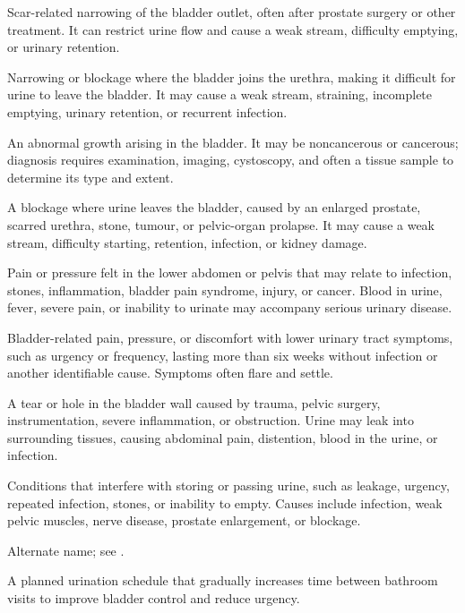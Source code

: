  Scar-related narrowing of the bladder outlet, often after prostate surgery or other treatment. It can restrict urine flow and cause a weak stream, difficulty emptying, or urinary retention.

 Narrowing or blockage where the bladder joins the urethra, making it difficult for urine to leave the bladder. It may cause a weak stream, straining, incomplete emptying, urinary retention, or recurrent infection.

 An abnormal growth arising in the bladder. It may be noncancerous or cancerous; diagnosis requires examination, imaging, cystoscopy, and often a tissue sample to determine its type and extent.

 A blockage where urine leaves the bladder, caused by an enlarged prostate, scarred urethra, stone, tumour, or pelvic-organ prolapse. It may cause a weak stream, difficulty starting, retention, infection, or kidney damage.

 Pain or pressure felt in the lower abdomen or pelvis that may relate to infection, stones, inflammation, bladder pain syndrome, injury, or cancer. Blood in urine, fever, severe pain, or inability to urinate may accompany serious urinary disease.

 Bladder-related pain, pressure, or discomfort with lower urinary tract symptoms, such as urgency or frequency, lasting more than six weeks without infection or another identifiable cause. Symptoms often flare and settle.

 A tear or hole in the bladder wall caused by trauma, pelvic surgery, instrumentation,
severe inflammation, or obstruction. Urine may leak into surrounding tissues, causing abdominal pain,
distention, blood in the urine, or infection.

 Conditions that interfere with storing or passing urine, such as leakage, urgency, repeated infection, stones, or inability to empty. Causes include infection, weak pelvic muscles, nerve disease, prostate enlargement, or blockage.

 Alternate name; see .

 A planned urination schedule that gradually increases time between bathroom visits to improve bladder control and reduce urgency.

